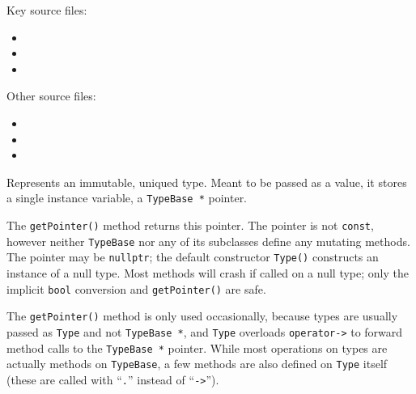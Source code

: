 \documentclass[../generics]{subfiles}
\begin{document}
Key source files:
\begin{itemize}
\item {}
\item {}
\item {}
\end{itemize}
Other source files:
\begin{itemize}
\item {}
\item {}
\item {}
\end{itemize}

Represents an immutable, uniqued type. Meant to be passed as a value, it stores a single instance variable, a \texttt{TypeBase *} pointer.

The \texttt{getPointer()} method returns this pointer. The pointer is not \texttt{const}, however neither \texttt{TypeBase} nor any of its subclasses define any mutating methods. The pointer may be \texttt{nullptr}; the default constructor \texttt{Type()} constructs an instance of a null type. Most methods will crash if called on a null type; only the implicit \texttt{bool} conversion and \texttt{getPointer()} are safe.

The \texttt{getPointer()} method is only used occasionally, because types are usually passed as \texttt{Type} and not \texttt{TypeBase *}, and \texttt{Type} overloads \texttt{operator->} to forward method calls to the \texttt{TypeBase *} pointer. While most operations on types are actually methods on \texttt{TypeBase}, a few methods are also defined on \texttt{Type} itself (these are called with ``\texttt{.}'' instead of ``\texttt{->}'').
\end{document}
